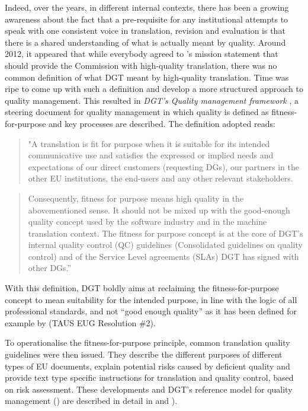 \documentclass[output=paper]{langsci/langscibook}
\begin{document}
Indeed, over the years, in different internal contexts, there has been a growing awareness about the fact that a pre-requisite for any institutional attempts to speak with one consistent voice in translation, revision and evaluation is that there is a shared understanding of what is actually meant by quality. Around 2012, it appeared that while everybody agreed to \citeauthor{DGT2014}'s mission statement that \citeauthor{DGT2014} should provide the Commission with high-quality translation, there was no common definition of what DGT meant by high-quality translation. Time was ripe to come up with such a definition and develop a more structured approach to quality management. This resulted in \textit{DGT's Quality management framework} \citep{DGT2014}, a steering document for quality management in which quality is defined as fitness-for-purpose and key processes are described. The definition adopted reads:

\begin{quote}
"A translation is fit for purpose when it is suitable for its intended communicative use and satisfies the expressed or implied needs and expectations of our direct customers (requesting DGs), our partners in the other EU institutions, the end-users and any other relevant stakeholders. 
\end{quote}

\begin{quote}
Consequently, fitness for purpose means high quality in the abovementioned sense. It should not be mixed up with the good-enough quality concept used by the software industry and in the machine translation context. The fitness for purpose concept is at the core of DGT’s internal quality control (QC) guidelines (Consolidated guidelines on quality control) and of the Service Level agreements (SLAs) DGT has signed with other DGs.'' 
\end{quote}

With this definition, DGT boldly aims at reclaiming the fitness-for-purpose concept to mean suitability for the intended purpose, in line with the logic of all professional standards, and not ``good enough quality'' as it has been defined for example by \citeauthor{TAUS2017dqf} (TAUS EUG Resolution \#2).

To operationalise the fitness-for-purpose principle, common translation quality guidelines \citep{DGT2015a} were then issued. They describe the different purposes of different types of EU documents, explain potential risks caused by deficient quality and provide text type specific instructions for translation and quality control, based on risk assessment. These developments and DGT's reference model for quality management () are described in detail in \citet{Strandvik2017} and \citet{DruganEtAlforthcoming}). 
\end{document}
